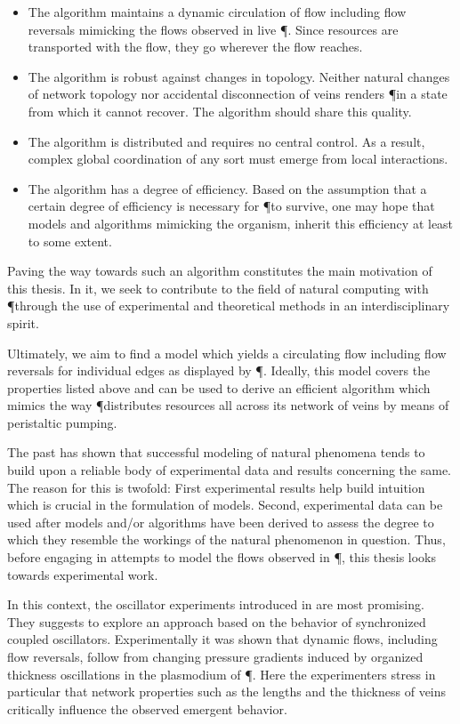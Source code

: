 	\begin{itemize}
		\item The algorithm maintains a dynamic circulation of flow including flow reversals mimicking the flows observed in live \P. Since resources are transported with the flow, they go wherever the flow reaches.
		\item The algorithm is robust against changes in topology. Neither natural changes of network topology nor accidental disconnection of veins renders \P in a state from which it cannot recover. The algorithm should share this quality.
		\item The algorithm is distributed and requires no central control. As a result, complex global coordination of any sort must emerge from local interactions.
		\item The algorithm has a degree of efficiency. Based on the assumption that a certain degree of efficiency is necessary for \P to survive, one may hope that models and algorithms mimicking the organism, inherit this efficiency at least to some extent.
	\end{itemize}

	Paving the way towards such an algorithm constitutes the main motivation of this thesis. In it, we seek to contribute to the field of natural computing with \P through the use of experimental and theoretical methods in an interdisciplinary spirit.

	Ultimately, we aim to find a model which yields a circulating flow including flow reversals for individual edges as displayed by \P. Ideally, this model covers the properties listed above and can be used to derive an efficient algorithm which mimics the way \P distributes resources all across its network of veins by means of peristaltic pumping. 

	The past has shown that successful modeling of natural phenomena tends to build upon a reliable body of experimental data and results concerning the same. The reason for this is twofold: First experimental results help build intuition which is crucial in the formulation of models. Second, experimental data can be used after models and/or algorithms have been derived to assess the degree to which they resemble the workings of the natural phenomenon in question. Thus, before engaging in attempts to model the flows observed in \P, this thesis looks towards experimental work.

	In this context, the oscillator experiments introduced in  are most promising. They suggests to explore an approach based on the behavior of synchronized coupled oscillators. Experimentally it was shown that dynamic flows, including flow reversals, follow from changing pressure gradients induced by organized thickness oscillations in the plasmodium of \P. Here the experimenters stress in particular that network properties such as the lengths and the thickness of veins critically influence the observed emergent behavior. 

